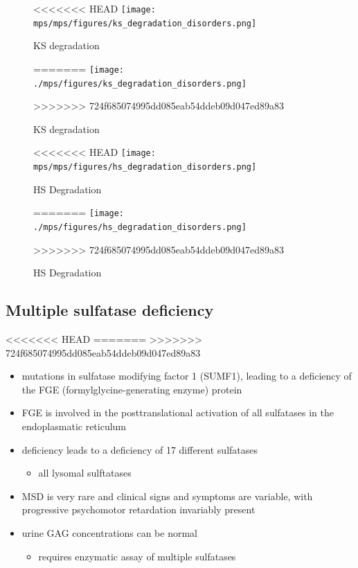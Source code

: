 \documentclass[fontsize=12pt]{scrartcl}
\begin{document}
\begin{enumerate}
\begin{enumerate}
\begin{enumerate}
\begin{enumerate}
\begin{table}[htbp]
\begin{enumerate}
\begin{enumerate}
\begin{enumerate}
\begin{enumerate}
\begin{figure}[htbp]
\centering
<<<<<<< HEAD
\texttt{[image: mps/mps/figures/ks\_degradation\_disorders.png]}
\caption[KS Degradation]{\label{fig:org3cee133}KS degradation}
=======
\texttt{[image: ./mps/figures/ks\_degradation\_disorders.png]}
\caption[KS Degradation]{\label{fig:org8aa4a97}
KS degradation}
>>>>>>> 724f685074995dd085eab54ddeb09d047ed89a83
\end{figure}

\begin{figure}[htbp]
\centering
<<<<<<< HEAD
\texttt{[image: mps/mps/figures/hs\_degradation\_disorders.png]}
\caption[HS Degradation]{\label{fig:orgaeaf80f}HS Degradation}
=======
\texttt{[image: ./mps/figures/hs\_degradation\_disorders.png]}
\caption[HS Degradation]{\label{fig:org99eaa76}
HS Degradation}
>>>>>>> 724f685074995dd085eab54ddeb09d047ed89a83
\end{figure}
\end{enumerate}

\subsection{Multiple sulfatase deficiency}
<<<<<<< HEAD
\label{sec:orgb81b494}
=======
\label{sec:org5c5dac4}
>>>>>>> 724f685074995dd085eab54ddeb09d047ed89a83
\begin{itemize}
\item mutations in sulfatase modifying factor 1 (SUMF1), leading to a
deficiency of the FGE (formylglycine-generating enzyme) protein
\item FGE is involved in the posttranslational activation of all
sulfatases in the endoplasmatic reticulum
\item deficiency leads to a deficiency of 17 different sulfatases
\begin{itemize}
\item all lysomal sulftatases
\end{itemize}
\item MSD is very rare and clinical signs and symptoms are variable, with progressive psychomotor retardation invariably present
\item urine GAG concentrations can be normal
\begin{itemize}
\item requires enzymatic assay of multiple sulfatases
\end{itemize}
\end{itemize}


\end{enumerate}
\end{enumerate}
\end{enumerate}
\end{table}
\end{enumerate}
\end{enumerate}
\end{enumerate}
\end{enumerate}
\end{document}
